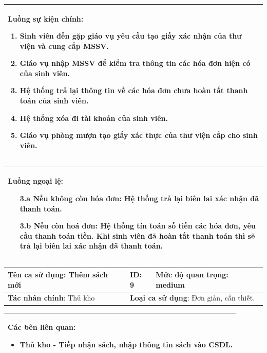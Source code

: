 \documentclass[12pt]{report}
\begin{document}
\begin{center}
\begin{tabular}{| m{15.9cm} |}
    \hline
    \textbf{Luồng sự kiện chính}:
    \begin{enumerate}
        \item Sinh viên đến gặp giáo vụ yêu cầu tạo giấy xác nhận của thư viện và cung cấp MSSV. 
        \item Giáo vụ nhập MSSV để kiểm tra thông tin các hóa đơn hiện có của sinh viên. 
        \item Hệ thống trả lại thông tin về các hóa đơn chưa hoàn tất thanh toán của sinh viên. 
        \item Hệ thống xóa đi tài khoản của sinh viên. 
        \item Giáo vụ phòng mượn tạo giấy xác thực của thư viện cấp cho sinh viên. 
    \end{enumerate} \\
    \hline
\end{tabular}

\begin{tabular}{| m{15.9cm} |}
    \hline
    \textbf{Luồng ngoại lệ}:
    \begin{enumerate}
        \item[3.a] Nếu không còn hóa đơn: Hệ thống trả lại biên lai xác nhận đã thanh toán. 
        \item[3.b] Nếu còn hoá đơn: Hệ thống tín toán số tiền các hóa đơn, yêu cầu thanh toán tiền. Khi sinh viên đã hoàn tất thanh toán thì sẽ 
            trả lại biên lai xác nhận đã thanh toán. 
    \end{enumerate} \\
    \hline
\end{tabular}

\newpage
\begin{tabular}{| m{6cm} | m{3cm} | m{6cm} |}
    \hline
    \textbf{Tên ca sử dụng}: Thêm sách mới & \textbf{ID}: 9 & \textbf{Mức độ quan trọng}: medium \\
    \hline
    \textbf{Tác nhân chính}: Thủ kho & \multicolumn{2}{|l|}{\textbf{Loại ca sử dụng}: Đơn giản, cần thiết.} \\
    \hline
\end{tabular}
\begin{tabular}{| m{15.9cm} |}
    \hline
        \textbf{Các bên liên quan:} 
        \begin{itemize}
            \item Thủ kho - Tiếp nhận sách, nhập thông tin sách vào CSDL. 
        \end{itemize} \\
    \hline
\end{tabular}


\end{center}
\end{document}
